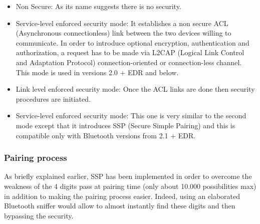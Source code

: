   \begin{itemize}[nolistsep,noitemsep]
  	\item Non Secure: As its name suggests there is no security.
  	\item Service-level enforced security mode: It establishes a non secure ACL (Asynchronous connectionless) link between the two devices willing to communicate. In order to introduce optional encryption, authentication and authorization, a request has to be made via L2CAP (Logical Link Control and Adaptation Protocol) connection-oriented or connection-less channel. This mode is used in versions 2.0 + EDR and below.
  	\item Link level enforced security mode: Once the ACL links are done then security procedures are initiated.
  	\item Service-level enforced security mode: This one is very similar to the second mode except that it introduces SSP (Secure Simple Pairing) and this is compatible only with Bluetooth versions from 2.1 + EDR.
  \end{itemize}

\subsubsection{Pairing process}

As briefly explained earlier, SSP has been implemented in order to overcome the weakness of the 4 digits pass at pairing time (only about 10.000 possibilities max) in addition to making the pairing process easier. Indeed, using an elaborated Bluetooth sniffer would allow to almost instantly find these digits and then bypassing the security.\\
	
